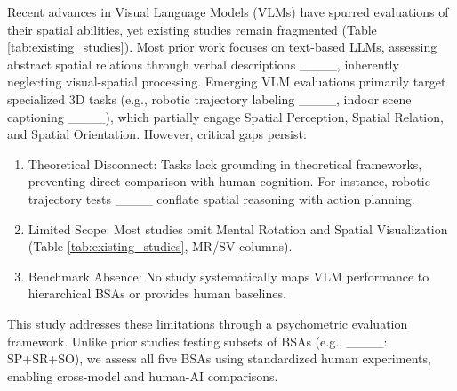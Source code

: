 Recent advances in Visual Language Models (VLMs) have spurred evaluations of their spatial abilities, yet existing studies remain fragmented (Table \ref{tab:existing_studies}). Most prior work focuses on text-based LLMs, assessing abstract spatial relations through verbal descriptions ____, inherently neglecting visual-spatial processing. Emerging VLM evaluations primarily target specialized 3D tasks (e.g., robotic trajectory labeling ____, indoor scene captioning ____), which partially engage Spatial Perception, Spatial Relation, and Spatial Orientation. However, critical gaps persist: 

\begin{enumerate}

\item Theoretical Disconnect: Tasks lack grounding in theoretical frameworks, preventing direct comparison with human cognition. For instance, robotic trajectory tests ____ conflate spatial reasoning with action planning.
\item Limited Scope: Most studies omit Mental Rotation and Spatial Visualization (Table \ref{tab:existing_studies}, MR/SV columns).
\item Benchmark Absence: No study systematically maps VLM performance to hierarchical BSAs or provides human baselines.

\end{enumerate}

This study addresses these limitations through a psychometric evaluation framework. Unlike prior studies testing subsets of BSAs (e.g., ____: SP+SR+SO), we assess all five BSAs using standardized human experiments, enabling cross-model and human-AI comparisons.


